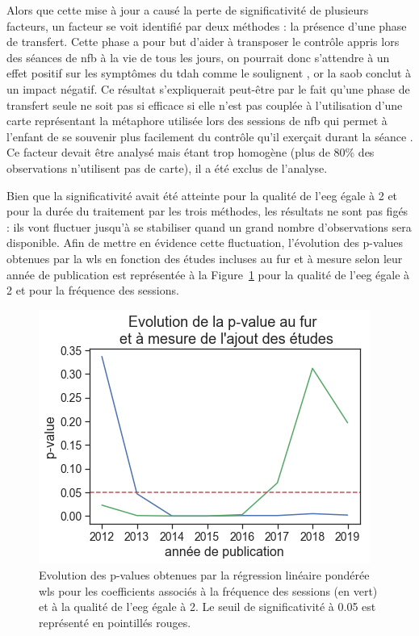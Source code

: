 Alors que cette mise à jour a causé la perte de significativité de plusieurs facteurs, un facteur se voit identifié par deux méthodes : la présence d'une phase de transfert. 
Cette phase a pour but d'aider à transposer le contrôle appris lors des séances de \gls{nfb} à la vie de tous les jours, on pourrait donc s'attendre à un effet positif sur les symptômes
du \gls{tdah} comme le soulignent \citet{Arns2014, Strehl2006, Gani2008}, or la \gls{saob} conclut à un impact négatif. Ce résultat s'expliquerait peut-être par le fait qu'une phase de 
transfert seule ne soit pas si efficace si elle n'est pas couplée à l'utilisation d'une carte représentant la métaphore utilisée lors des sessions de \gls{nfb} qui permet à l'enfant de se 
souvenir plus facilement du contrôle qu'il exerçait durant la séance \citep{Bioulac2019, Bluschke2016}. Ce facteur devait être analysé mais étant trop homogène (plus de 80\% des observations n'utilisent pas de carte), il 
a été exclus de l'analyse. 

Bien que la significativité avait été atteinte pour la qualité de l'\gls{eeg} égale à 2 et pour la durée du traitement par les trois méthodes, 
les résultats ne sont pas figés : ils vont fluctuer jusqu'à se stabiliser quand un grand nombre d'observations sera disponible. Afin de mettre en évidence cette fluctuation, l'évolution 
des p-values obtenues par la \gls{wls} en fonction des études incluses au fur et à mesure selon leur année de publication est représentée à la Figure~\ref{Figure:factors_evolution_pvalue} 
pour la qualité de l'\gls{eeg} égale à 2 et pour la fréquence des sessions.

\begin{figure}[h!]
  \centering
	\includegraphics[width=0.7\linewidth]{figures/chapter-3/factors-pvalue-evolution} 
  \caption{Evolution des p-values obtenues par la régression linéaire pondérée \gls{wls} pour les coefficients associés à la fréquence des sessions (en vert) et à la qualité de l'\gls{eeg} égale à 2. 
	Le seuil de significativité à 0.05 est représenté en pointillés rouges.}
  \label{Figure:factors_evolution_pvalue}
\end{figure}

